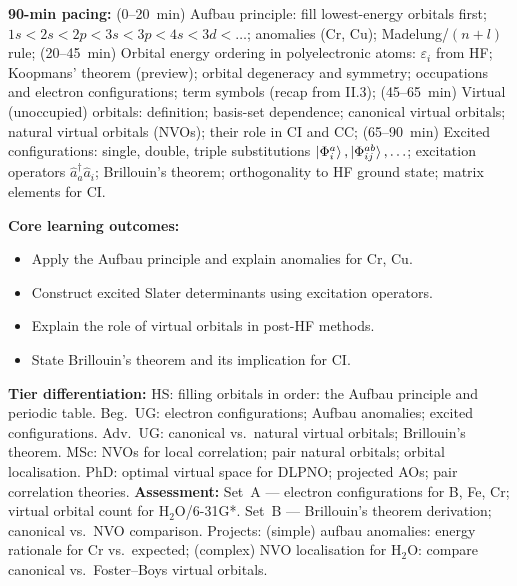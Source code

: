 \documentclass[11pt,a4paper]{article}
\begin{document}
\begin{tcolorbox}[chembox, title={Module~III.2 --- Lecture L08: Electronic Configurations, Aufbau, and Virtual Orbitals}]
\textbf{90-min pacing:} (0--20~min) Aufbau principle: fill lowest-energy orbitals first; $1s<2s<2p<3s<3p<4s<3d<\ldots$; anomalies (Cr, Cu); Madelung/$(n+l)$ rule; (20--45~min) Orbital energy ordering in polyelectronic atoms: $\varepsilon_i$ from HF; Koopmans' theorem (preview); orbital degeneracy and symmetry; occupations and electron configurations; term symbols (recap from II.3); (45--65~min) Virtual (unoccupied) orbitals: definition; basis-set dependence; canonical virtual orbitals; natural virtual orbitals (NVOs); their role in CI and CC; (65--90~min) Excited configurations: single, double, triple substitutions $\ket{\Phi_i^a},\ket{\Phi_{ij}^{ab}},\ldots$; excitation operators $\hat{a}^\dagger_a\hat{a}_i$; Brillouin's theorem; orthogonality to HF ground state; matrix elements for CI.

\medskip\textbf{Core learning outcomes:}
\begin{itemize}[leftmargin=1.4em,topsep=2pt,itemsep=1pt]
  \item Apply the Aufbau principle and explain anomalies for Cr, Cu.
  \item Construct excited Slater determinants using excitation operators.
  \item Explain the role of virtual orbitals in post-HF methods.
  \item State Brillouin's theorem and its implication for CI.
\end{itemize}
\medskip\textbf{Tier differentiation:}
HS: filling orbitals in order: the Aufbau principle and periodic table.
Beg.\ UG: electron configurations; Aufbau anomalies; excited configurations.
Adv.\ UG: canonical vs.\ natural virtual orbitals; Brillouin's theorem.
MSc: NVOs for local correlation; pair natural orbitals; orbital localisation.
PhD: optimal virtual space for DLPNO; projected AOs; pair correlation theories.
\medskip\textbf{Assessment:}
Set~A --- electron configurations for B, Fe, Cr; virtual orbital count for H$_2$O/6-31G*.
Set~B --- Brillouin's theorem derivation; canonical vs.\ NVO comparison.
Projects: (simple) aufbau anomalies: energy rationale for Cr vs.\ expected; (complex) NVO localisation for H$_2$O: compare canonical vs.\ Foster--Boys virtual orbitals.
\end{tcolorbox}

\medskip
\end{document}
